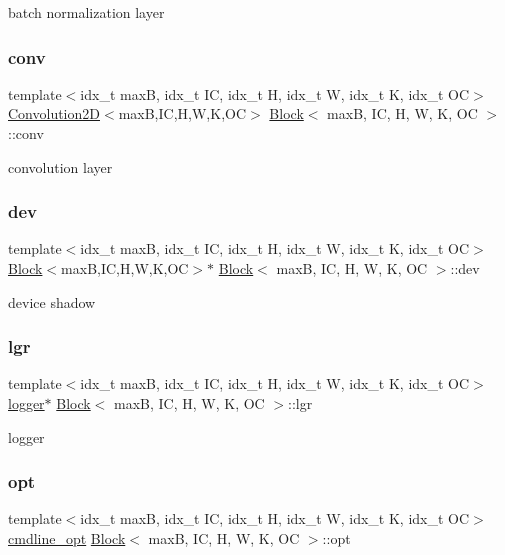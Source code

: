 batch normalization layer \mbox{\label{structBlock_aac195c086bc1302e8324aa1d89067668}} 
\subsubsection{\texorpdfstring{conv}{conv}}
{\footnotesize\ttfamily template$<$idx\+\_\+t maxB, idx\+\_\+t IC, idx\+\_\+t H, idx\+\_\+t W, idx\+\_\+t K, idx\+\_\+t OC$>$ \\
\hyperlink{structConvolution2D}{Convolution2D}$<$maxB,IC,H,W,K,OC$>$ \hyperlink{structBlock}{Block}$<$ maxB, IC, H, W, K, OC $>$\+::conv}

convolution layer \mbox{\label{structBlock_a66767aae2045de05ce1dc09a92d164c4}} 
\subsubsection{\texorpdfstring{dev}{dev}}
{\footnotesize\ttfamily template$<$idx\+\_\+t maxB, idx\+\_\+t IC, idx\+\_\+t H, idx\+\_\+t W, idx\+\_\+t K, idx\+\_\+t OC$>$ \\
\hyperlink{structBlock}{Block}$<$maxB,IC,H,W,K,OC$>$$\ast$ \hyperlink{structBlock}{Block}$<$ maxB, IC, H, W, K, OC $>$\+::dev}

device shadow \mbox{\label{structBlock_a8e037036c2020d2ac98fc0792d3f84f4}} 
\subsubsection{\texorpdfstring{lgr}{lgr}}
{\footnotesize\ttfamily template$<$idx\+\_\+t maxB, idx\+\_\+t IC, idx\+\_\+t H, idx\+\_\+t W, idx\+\_\+t K, idx\+\_\+t OC$>$ \\
\hyperlink{structlogger}{logger}$\ast$ \hyperlink{structBlock}{Block}$<$ maxB, IC, H, W, K, OC $>$\+::lgr}

logger \mbox{\label{structBlock_ad91e112b767ccd7035a37873cbc121a9}} 
\subsubsection{\texorpdfstring{opt}{opt}}
{\footnotesize\ttfamily template$<$idx\+\_\+t maxB, idx\+\_\+t IC, idx\+\_\+t H, idx\+\_\+t W, idx\+\_\+t K, idx\+\_\+t OC$>$ \\
\hyperlink{structcmdline__opt}{cmdline\+\_\+opt} \hyperlink{structBlock}{Block}$<$ maxB, IC, H, W, K, OC $>$\+::opt}

